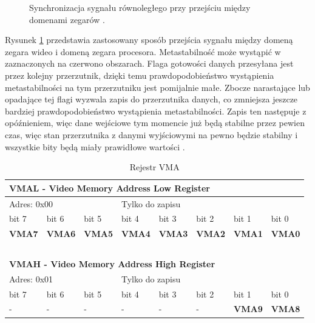 \begin{figure}[h]	
	\centering
	\caption{ Synchronizacja sygnału równoległego przy przejściu między domenami zegarów \cite{CrossDomainEricsson}. }
	\label{CrossDomain}
\end{figure}

Rysunek \ref{CrossDomain} przedstawia zastosowany sposób przejścia sygnału między domeną zegara wideo i domeną zegara procesora. Metastabilność może wystąpić w zaznaczonych na czerwono obszarach. Flaga gotowości danych przesyłana jest przez kolejny przerzutnik, dzięki temu prawdopodobieństwo wystąpienia metastabilności na tym przerzutniku jest pomijalnie małe. Zbocze narastające lub opadające tej flagi wyzwala zapis do przerzutnika danych, co zmniejsza jeszcze bardziej prawdopodobieństwo wystąpienia metastabilności. Zapis ten następuje z opóźnieniem, więc dane wejściowe tym momencie już będą stabilne przez pewien czas, więc stan przerzutnika z danymi wyjściowymi na pewno będzie stabilny i wszystkie bity będą miały prawidłowe wartości \cite{CrossDomainEricsson}.


\begin{table}[h]
	\begin{center}
		{\footnotesize
		\begin{tabular}{|l|l|l|l|l|l|l|l|}
			\hline
			\multicolumn{8}{|l|}{ \textbf{VMAL - Video Memory Address Low Register} } \\
			\hline
			\multicolumn{3}{|l}{ Adres: 0x00 } & \multicolumn{5}{l|}{ Tylko do zapisu } \\
			\hline
			\hline bit 7 & bit 6 & bit 5 & bit 4 & bit 3 & bit 2 & bit 1 & bit 0 \\				
			\hline \textbf{VMA7} & \textbf{VMA6} & \textbf{VMA5} & \textbf{VMA4} & \textbf{VMA3} & \textbf{VMA2} & \textbf{VMA1} & \textbf{VMA0} \\				
			\hline \multicolumn{8}{l}{ ~ } \\
			
			\hline
			\multicolumn{8}{|l|}{ \textbf{VMAH - Video Memory Address High Register} } \\
			\hline
			\multicolumn{3}{|l}{ Adres: 0x01 } & \multicolumn{5}{l|}{ Tylko do zapisu } \\
			\hline
			\hline bit 7 & bit 6 & bit 5 & bit 4 & bit 3 & bit 2 & bit 1 & bit 0 \\				
			\hline - & - & - & - & - & - & \textbf{VMA9} & \textbf{VMA8} \\				
			\hline
		\end{tabular}}
		\caption{ Rejestr VMA }
		\label{tab:videoVMA}
	\end{center}
\end{table}

